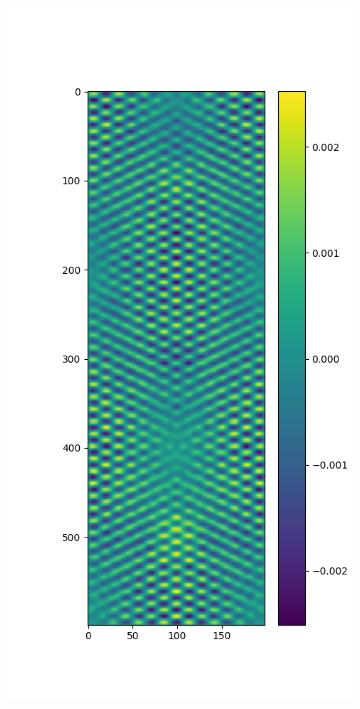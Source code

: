 \documentclass{article}
\begin{document}
\begin{figure}[H]
	\begin{subfigure}{.5\textwidth}
		\centering
		\includegraphics[width=.9\linewidth]{3steadyc=1.png}
	\end{subfigure}
	\begin{subfigure}{.5\textwidth}
		\centering

\end{subfigure}
\end{figure}
\end{document}
